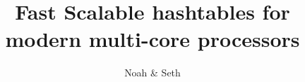 \documentclass[12pt,twocolumn,letterpaper]{article}
\begin{document}
\title{Fast Scalable hashtables for modern multi-core processors}

\author{Noah \& Seth}











\end{document}
